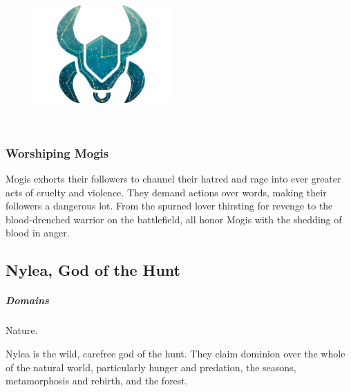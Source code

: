     \begin{figure}[b]
        \centering
        \includegraphics[width=0.47\textwidth]{02viphoger/img/10s_mogis.png}
    \end{figure}

    \pagebreak~
    \vspace{14.0cm}

    \subsubsection{Worshiping Mogis}
        Mogis exhorts their followers to channel their hatred and rage into ever greater acts of cruelty and violence.
        They demand actions over words, making their followers a dangerous lot.
        From the spurned lover thirsting for revenge to the blood-drenched warrior on the battlefield, all honor Mogis with the shedding of blood in anger.



\subsection*{Nylea, God of the Hunt} \label{ssec::nylea}
    \subparagraph{Domains} Nature.

    Nylea is the wild, carefree god of the hunt.
    They claim dominion over the whole of the natural world, particularly hunger and predation, the seasons, metamorphosis and rebirth, and the forest.

